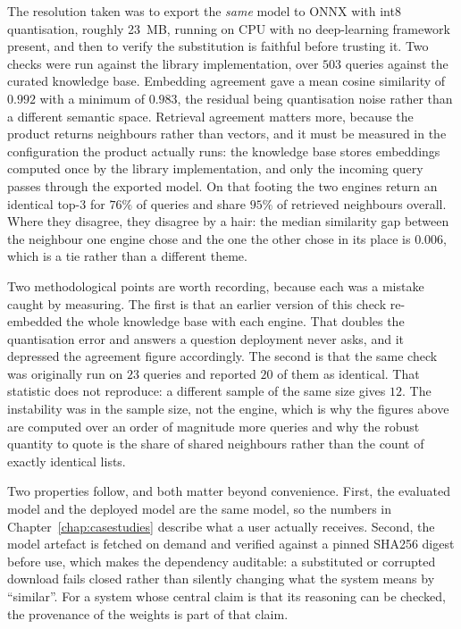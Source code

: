 The resolution taken was to export the \emph{same} model to ONNX with int8 quantisation, roughly
23~MB, running on CPU with no deep-learning framework present, and then to verify the substitution is
faithful before trusting it. Two checks were run against the library implementation, over $503$
queries against the curated knowledge base. Embedding agreement gave a mean cosine similarity of
$0.992$ with a minimum of $0.983$, the residual being quantisation noise rather than a different
semantic space. Retrieval agreement matters more, because the product returns neighbours rather than
vectors, and it must be measured in the configuration the product actually runs: the knowledge base
stores embeddings computed once by the library implementation, and only the incoming query passes
through the exported model. On that footing the two engines return an identical top-3 for $76\%$ of
queries and share $95\%$ of retrieved neighbours overall. Where they disagree, they disagree by a
hair: the median similarity gap between the neighbour one engine chose and the one the other chose in
its place is $0.006$, which is a tie rather than a different theme.

Two methodological points are worth recording, because each was a mistake caught by measuring.
The first is that an earlier version of this check re-embedded the whole knowledge base with each
engine. That doubles the quantisation error and answers a question deployment never asks, and it
depressed the agreement figure accordingly. The second is that the same check was originally run on
$23$ queries and reported $20$ of them as identical. That statistic does not reproduce: a different
sample of the same size gives $12$. The instability was in the sample size, not the engine, which is
why the figures above are computed over an order of magnitude more queries and why the robust
quantity to quote is the share of shared neighbours rather than the count of exactly identical
lists.

Two properties follow, and both matter beyond convenience. First, the evaluated model and the deployed
model are the same model, so the numbers in Chapter~\ref{chap:casestudies} describe what a user actually
receives. Second, the model artefact is fetched on demand and verified against a pinned SHA256 digest
before use, which makes the dependency auditable: a substituted or corrupted download fails closed
rather than silently changing what the system means by ``similar''. For a system whose central claim is
that its reasoning can be checked, the provenance of the weights is part of that claim.

